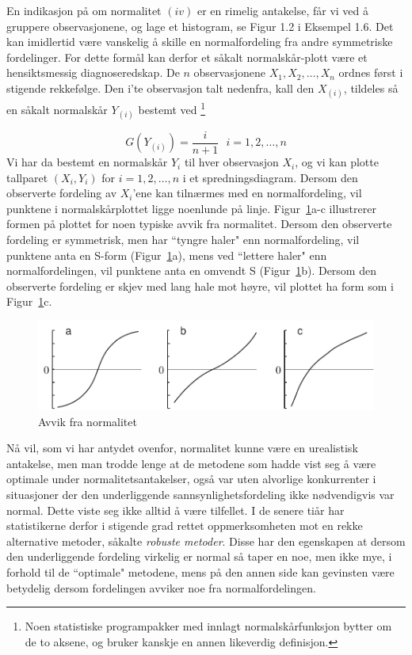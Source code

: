 En indikasjon på om normalitet $(iv)$ er en rimelig
antakelse, får vi ved å gruppere observasjonene, og lage
et histogram, se Figur 1.2 i Eksempel 1.6. Det kan imidlertid
være vanskelig å skille en normalfordeling fra andre
symmetriske fordelinger. For dette formål kan derfor et
såkalt normalskår-plott være et hensiktsmessig
diagnoseredskap. De $n$ observasjonene $X_1,X_2,\ldots ,X_n$
ordnes først i stigende rekkefølge. Den i'te observasjon
talt nedenfra, kall den $X_{(i)}$, tildeles så en såkalt
normalskår $Y_{(i)}$ bestemt ved \footnote{Noen statistiske
programpakker med innlagt normalskårfunksjon bytter om de to aksene, og
bruker kanskje en annen likeverdig definisjon.} 

\[     G(Y_{(i)})=\frac{i}{n+1} \mbox{\ \ \ }   i=1,2,\ldots ,n\]
Vi har da bestemt en normalskår $Y_i$ til hver observasjon
$X_i$, og vi kan plotte tallparet $(X_i,Y_i)$ for
$i=1,2,\ldots ,n$ i et spredningsdiagram. Dersom
den observerte fordeling av $X_i$'ene kan tilnærmes med en
normalfordeling, vil punktene i normalskårplottet ligge
noenlunde på linje. Figur~\ref{fig:avvik_normalitet}a-c illu\-strerer formen på
plottet for noen typiske avvik fra normalitet. Dersom den
observerte fordeling er symmetrisk, men har ``tyngre haler" enn
normalfordeling, vil punktene anta en S-form (Figur~\ref{fig:avvik_normalitet}a), mens ved
``lettere haler" enn normalfordelingen, vil punktene anta en
omvendt S (Figur~\ref{fig:avvik_normalitet}b). Dersom den observerte fordeling er skjev
med lang hale mot høyre, vil plottet ha form som i Figur~\ref{fig:avvik_normalitet}c.

\begin{figure}[H]
\centering
	 \includegraphics[scale=0.7]{figurer/fig8_9.pdf} 
 \caption{Avvik fra normalitet}
	\label{fig:avvik_normalitet}
\end{figure}
Nå vil, som vi har antydet ovenfor, normalitet kunne være
en urea\-listisk antakelse, men man trodde lenge at de metodene som
hadde vist seg å være optimale under
normalitetsantakelser, også var uten alvorlige konkurrenter i
situasjoner der den underliggende 
sannsynlighetsfordeling ikke nødvendigvis var normal. Dette
viste seg ikke alltid å være tilfellet. I de senere
tiår har statistikerne derfor i stigende grad rettet
oppmerksomheten mot en rekke alternative metoder, såkalte
{\em robuste metoder}. Disse har den egenskapen at dersom den
underliggende fordeling virkelig er normal så taper en noe,
men ikke mye, i forhold til de ``optimale" metodene, mens på
den annen side kan gevinsten være betydelig dersom
fordelingen avviker noe fra normalfordelingen.

